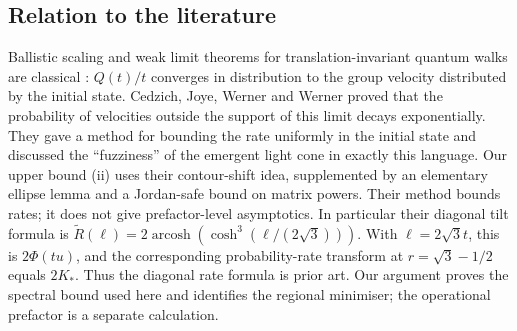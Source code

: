 \documentclass[11pt]{amsart}
\theoremstyle{definition}
\theoremstyle{remark}
\newcommand{\arcosh}{\operatorname{arcosh}}
\begin{document}
\subsection*{Relation to the literature}
Ballistic scaling and weak limit theorems for translation-invariant quantum
walks are classical \cite{Konno,GJS,AVWW}: $Q(t)/t$ converges in
distribution to the group velocity distributed by the initial state.
Cedzich, Joye, Werner and Werner \cite{CJWW} proved that the probability of
velocities outside the support of this limit decays exponentially.  They gave
a method for bounding the rate uniformly in the initial state and discussed
the ``fuzziness'' of the emergent light cone in exactly this language.  Our
upper bound (ii) uses their contour-shift idea, supplemented by an elementary
ellipse lemma and a Jordan-safe bound on matrix powers.  Their method bounds
rates; it does not give prefactor-level asymptotics.
In particular their diagonal tilt formula
\cite[Eq.~(5.21)]{CJWW} is
$\widetilde R(\ell)=2\arcosh(\cosh^3(\ell/(2\sqrt3)))$.
With $\ell=2\sqrt3t$, this is $2\Phi(tu)$, and the corresponding
probability-rate transform at $r=\sqrt3-1/2$ equals $2K_*$.
Thus the diagonal rate formula is prior art. Our argument proves the
spectral bound used here and identifies the regional minimiser; the
operational prefactor is a separate calculation.
\end{document}
